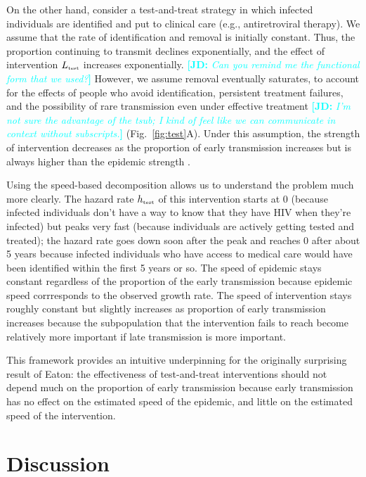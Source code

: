 \documentclass[12pt]{article}\usepackage[]{graphicx}\usepackage[]{color}
\newcommand{\comment}[3]{\textcolor{#1}{\textbf{[#2: }\textit{#3}\textbf{]}}}
\newcommand{\jd}[1]{\comment{cyan}{JD}{#1}}
\newcommand{\tsub}[2]{#1_{{\textrm{\tiny #2}}}}
\newcommand{\figref}[1]{Fig.~\ref{fig:#1}}
\begin{document}
On the other hand, consider a test-and-treat strategy in which infected individuals are identified and put to clinical care (e.g., antiretroviral therapy).
We assume that the rate of identification and removal is initially constant. Thus, the proportion continuing to transmit declines exponentially, and the effect of intervention $\tsub{L}{test}$ increases exponentially.
\jd{Can you remind me the functional form that we used?}
However, we assume removal eventually saturates, to account for the effects of people who avoid identification, persistent treatment failures, and the possibility of rare transmission even under effective treatment
\jd{I'm not sure the advantage of the tsub; I kind of feel like we can communicate in context without subscripts.} (\figref{test}A).
Under this assumption, the strength of intervention decreases as the proportion of early transmission increases but is always higher than the epidemic strength \citep{eaton2014proportion}.

Using the speed-based decomposition allows us to understand the problem much more clearly.
The hazard rate $\tsub{h}{test}$ of this intervention starts at 0 (because infected individuals don't have a way to know that they have HIV when they're infected) but peaks very fast (because individuals are actively getting tested and treated); 
the hazard rate goes down soon after the peak and reaches 0 after about 5 years because infected individuals who have access to medical care would have been identified within the first 5 years or so.
The speed of epidemic stays constant regardless of the proportion of the early transmission because epidemic speed corrresponds to the observed growth rate.
The speed of intervention stays roughly constant but slightly increases as proportion of early transmission increases because the subpopulation that the intervention fails to reach become relatively more important if late transmission is more important.

This framework provides an intuitive underpinning for the originally surprising result of Eaton: the effectiveness of test-and-treat interventions should not depend much on the proportion of early transmission because early transmission has no effect on the estimated speed of the epidemic, and little on the estimated speed of the intervention.

\section{Discussion}




\end{document}
